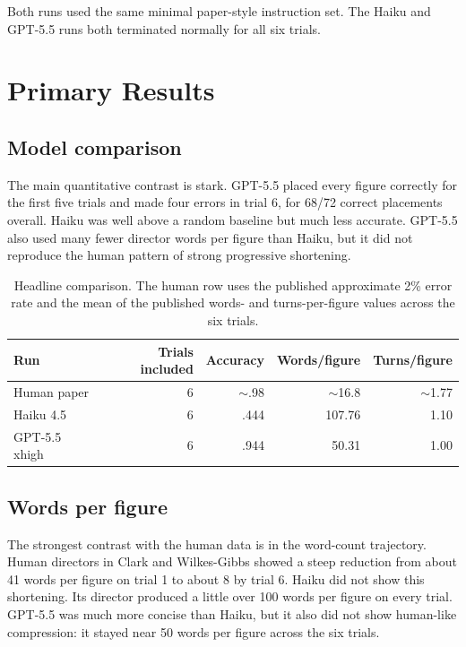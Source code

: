 \documentclass[11pt]{article}
\begin{document}
Both runs used the same minimal paper-style instruction set. The Haiku and GPT-5.5 runs both terminated normally for all six trials.

\section*{Primary Results}

\subsection*{Model comparison}

The main quantitative contrast is stark. GPT-5.5 placed every figure correctly for the first five trials and made four errors in trial 6, for 68/72 correct placements overall. Haiku was well above a random baseline but much less accurate. GPT-5.5 also used many fewer director words per figure than Haiku, but it did not reproduce the human pattern of strong progressive shortening.

\begin{table}[h]
\centering
\begin{tabular}{lrrrr}
\toprule
Run & Trials included & Accuracy & Words/figure & Turns/figure \\
\midrule
Human paper & 6 & $\sim$.98 & $\sim$16.8 & $\sim$1.77 \\
Haiku 4.5 & 6 & .444 & 107.76 & 1.10 \\
GPT-5.5 xhigh & 6 & .944 & 50.31 & 1.00 \\
\bottomrule
\end{tabular}
\caption{Headline comparison. The human row uses the published approximate 2\% error rate and the mean of the published words- and turns-per-figure values across the six trials.}
\end{table}

\subsection*{Words per figure}

The strongest contrast with the human data is in the word-count trajectory. Human directors in Clark and Wilkes-Gibbs showed a steep reduction from about 41 words per figure on trial 1 to about 8 by trial 6. Haiku did not show this shortening. Its director produced a little over 100 words per figure on every trial. GPT-5.5 was much more concise than Haiku, but it also did not show human-like compression: it stayed near 50 words per figure across the six trials.
\end{document}
